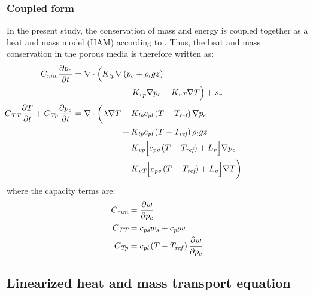 \subsubsection*{Coupled form}

In the present study, the conservation of mass and energy is coupled together as a heat and mass model (HAM) according to \citep{Janssen2002,Defraeye2011,Carmeliet2005,Saneinejad2013,Kubilay2018}. Thus, the heat and mass conservation in the porous media is therefore written as:
\begin{align}
	&\begin{aligned}
		\mathllap{C_{\textit{mm}}\frac{\partial p_c}{\partial t}} = \nabla \cdot \Big( K_{lp} \nabla &\left(p_c + \rho_l g z\right)\\
				   	 	 & + K_{\textit{vp}}\nabla p_c + K_{\textit{vT}}\nabla T \Big) + s_{r}
	\end{aligned}\\
	&\begin{aligned}
		\mathllap{C_{\textit{TT}}\frac{\partial T}{\partial t} + C_{\textit{Tp}}\frac{\partial p_c}{\partial t}} = \nabla \cdot \bigg(\lambda \nabla T &+  K_{\textit{lp}} c_{\textit{pl}} \left(T - T_{\textit{ref}}\right)  \nabla p_c \\
					&+ K_{\textit{lp}} c_{\textit{pl}} \left(T - T_{\textit{ref}}\right) \rho_l g z\\
					&- K_{\textit{vp}} \Big[c_{\textit{pv}} \left(T - T_{\textit{ref}}\right) + L_v\Big] \nabla p_c \\ 
					&- K_{\textit{vT}} \Big[c_{\textit{pv}} \left(T - T_{\textit{ref}}\right) + L_v\Big] \nabla T \bigg)
	\end{aligned}
\end{align}
where the capacity terms are:
\begin{align}
C_{\textit{mm}} &= \frac{\partial w}{\partial p_c} \\
C_{\textit{TT}} &=  c_{\textit{ps}}w_s + c_{\textit{pl}}w \\
C_{\textit{Tp}} &=  c_{\textit{pl}} \left( T - T_{\mathit{ref}}\right) \frac{\partial w}{\partial p_c}
\end{align}

\subsection{Linearized heat and mass transport equation}

